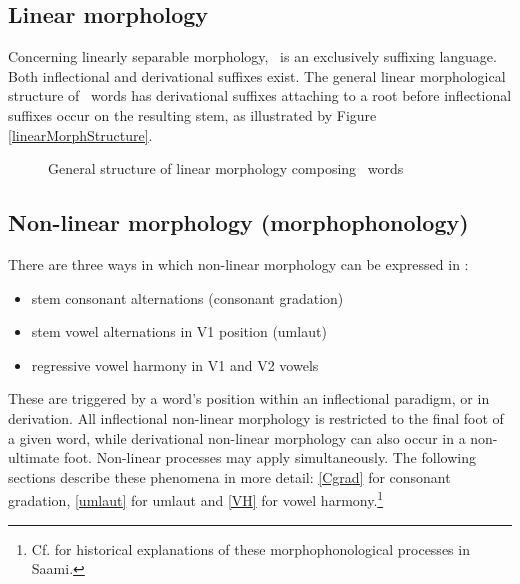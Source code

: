 \subsection{Linear morphology}\label{linearMorphology}
Concerning linearly separable morphology, \PS\ is an exclusively suffixing language. Both inflectional and derivational suffixes exist. %
The general linear morphological structure of \PS\ words has derivational suffixes attaching to a root before inflectional suffixes occur on the resulting stem, as illustrated by %
Figure \vref{linearMorphStructure}.
\begin{figure}[h]
\caption{General structure of linear morphology composing \PS\ words}\label{linearMorphStructure}
\end{figure}
%


\subsection{Non-linear morphology (morphophonology)}
There are three ways %
in which non-linear morphology can be expressed in \PS:
\begin{itemize}
\item{stem consonant alternations (consonant gradation)}
\item{stem vowel alternations in V1 position (umlaut)}
\item{regressive vowel harmony in V1 and V2 vowels}
\end{itemize}
These are triggered by a word’s position %
within an inflectional paradigm, or in derivation. All inflectional non-linear morphology is restricted to the final foot of a given word, while derivational non-linear morphology can also occur in a non-ultimate foot. Non-linear processes may apply simultaneously. The following sections describe these phenomena in more detail: \SEC\ref{Cgrad} for consonant gradation, \SEC\ref{umlaut} for umlaut and \SEC\ref{VH} for vowel harmony.\footnote{Cf. \citet{KorhonenM1969} for historical explanations of these morphophonological processes in Saami.} 



